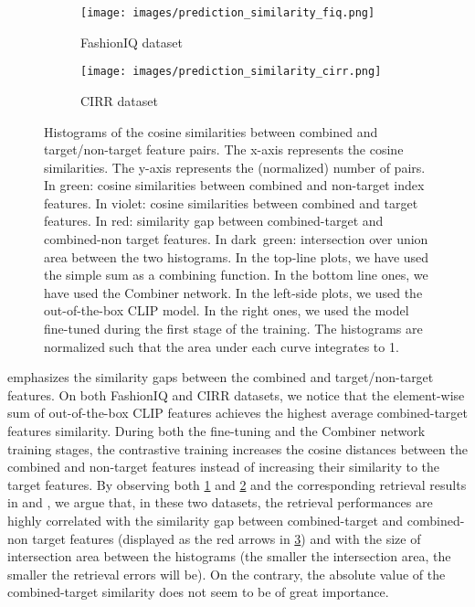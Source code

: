 \documentclass[acmlarge]{acmart}
\begin{document}
\begin{figure}[t]
    \centering
    \begin{subfigure}{0.48\linewidth}
    \texttt{[image: images/prediction\_similarity\_fiq.png]}
    \caption{FashionIQ dataset}
    \label{fig:predicted-fiq}
    \end{subfigure}\hfill
 \begin{subfigure}{0.48\linewidth}
    \texttt{[image: images/prediction\_similarity\_cirr.png]}
    \caption{CIRR dataset}
    \label{fig:predicted-cirr}
    \end{subfigure}
    \vspace{-1.8ex}
    \caption{Histograms of the cosine similarities between combined and target/non-target feature pairs.
    The x-axis represents the cosine similarities. The y-axis represents the (normalized) number of pairs. In \mbox{green{\LARGE\color{plotgreen}\textbullet}}: cosine similarities between combined and non-target index features. In \mbox{violet{\LARGE\color{plotviolet}\textbullet}}: cosine similarities between combined and target features. In \mbox{red{\LARGE\color{plotred}\textbullet}}: similarity gap between combined-target and combined-non target features. In \mbox{dark green{\LARGE\color{plotdarkgreen}\textbullet}}: intersection over union area between the two histograms.
    In the top-line plots, we have used the simple sum as a combining function. In the bottom line ones, we have used the Combiner network. In the left-side plots, we used the out-of-the-box CLIP model. In the right ones, we used the model fine-tuned during the first stage of the training. 
    The histograms are normalized such that the area under each curve integrates to 1.}
    \label{fig:predicted-similarities}
    \vspace{-2ex}
\end{figure}


 emphasizes the similarity gaps between the combined and target/non-target features. On both FashionIQ and CIRR datasets, we notice that the element-wise sum of out-of-the-box CLIP features achieves the highest average combined-target features similarity. During both the fine-tuning and the Combiner network training stages, the contrastive training increases the cosine distances between the combined and non-target features instead of increasing their similarity to the target features.
By observing both \cref{fig:predicted-fiq} and \cref{fig:predicted-cirr} and the corresponding retrieval results in  and , we argue that, in these two datasets, the retrieval performances are highly correlated with the similarity gap between combined-target and combined-non target features (displayed as the red arrows in \cref{fig:predicted-similarities}) and with the size of intersection area between the histograms (the smaller the intersection area, the smaller the retrieval errors will be). On the contrary, the absolute value of the combined-target similarity does not seem to be of great importance.
\end{document}
